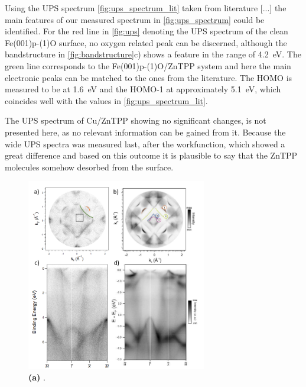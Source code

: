 \FloatBarrier
Using the UPS spectrum \autoref{fig:ups_spectrum_lit} taken from literature [...] the main features of our measured spectrum in \autoref{fig:ups_spectrum} could be identified.
For the red line in \autoref{fig:ups} denoting the UPS spectrum of the clean Fe(001)p-(1)O surface, no oxygen related peak can be discerned, although the bandstructure in \autoref{fig:bandstructure}c) shows a feature in the range of \qty{4.2}{eV}.
The green line corresponds to the Fe(001)p-(1)O/ZnTPP system and here the main electronic peaks can be matched to the ones from the literature.
The HOMO is measured to be at \qty{1.6}{eV} and the HOMO-1 at approximately \qty{5.1}{eV}, which coincides well with the values in \autoref{fig:ups_spectrum_lit}.

The UPS spectrum of Cu/ZnTPP showing no significant changes, is not presented here, as no relevant information can be gained from it.
Because the wide UPS spectra was measured last, after the workfunction, which showed a great difference and based on this outcome it is plausible to say that the ZnTPP molecules somehow desorbed from the surface.

\begin{figure}[h]
    \centering
    \includegraphics[width = 0.7\textwidth]{Plots/bandstructure.png}
    \caption{\textbf{(a)} .}
    \label{fig:bandstructure}
\end{figure}
\FloatBarrier

